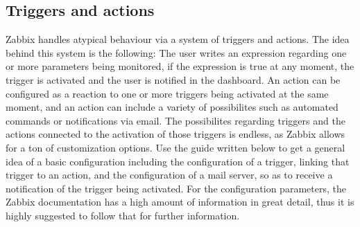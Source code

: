 \documentclass[a4paper,11pt]{scrartcl}
\begin{document}
\subsection{Triggers and actions}
Zabbix handles atypical behaviour via a system of triggers and actions. The idea behind this system is the following: The user writes an expression regarding one or more parameters being monitored, if the expression is true at any moment, the trigger is activated and the user is notified in the dashboard. An action can be configured as a reaction to one or more triggers being activated at the same moment, and an action can include a variety of possibilites such as automated commands or notifications via email. 
The possibilites regarding triggers and the actions connected to the activation of those triggers is endless, as Zabbix allows for a ton of customization options. Use the guide written below to get a general idea of a basic configuration including the configuration of a trigger, linking that trigger to an action, and the configuration of a mail server, so as to receive a notification of the trigger being activated. For the configuration parameters, the Zabbix documentation has a high amount of information in great detail, thus it is highly suggested to follow that for further information. 
\end{document}
